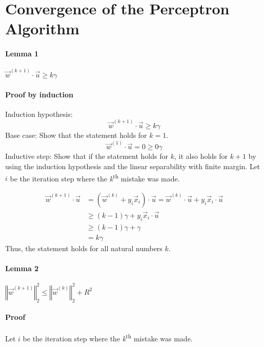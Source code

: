 \section{Convergence of the Perceptron Algorithm}
\paragraph{Lemma 1 }

$\vec{w}^{(k+1)}\cdot\vec{u}\geq k\gamma$


\paragraph*{Proof by induction}

Induction hypothesis: 
\[
\vec{w}^{(k+1)}\cdot\vec{u}\geq k\gamma
\]
Base case: Show that the statement holds for $k=1$. 
\[
\vec{w}^{(1)}\cdot\vec{u}=0\geq0\gamma
\]
Inductive step: Show that if the statement holds for $k$, it also
holds for $k+1$ by using the induction hypothesis and the linear
separability with finite margin. Let $i$ be the iteration step where
the \emph{k}\textsuperscript{th} mistake was made. 

\begin{align*}
\vec{w}^{(k+1)}\cdot\vec{u} & =(\vec{w}^{(k)}+y_{i}\vec{x}_{i})\cdot\vec{u}=\vec{w}^{(k)}\cdot\vec{u}+y_{i}\vec{x}_{i}\cdot\vec{u}\\
 & \geq(k-1)\gamma+y_{i}\vec{x}_{i}\cdot\vec{u}\\
 & \geq(k-1)\gamma+\gamma\\
 & =k\gamma
\end{align*}
Thus, the statement holds for all natural numbers $k$.


\paragraph*{Lemma 2}

$\left\Vert \vec{w}^{(k+1)}\right\Vert _{2}^{2}\leq\left\Vert \vec{w}^{(k)}\right\Vert _{2}^{2}+R^{2}$


\paragraph*{Proof}

Let $i$ be the iteration step where the \emph{k}\textsuperscript{th}
mistake was made.


